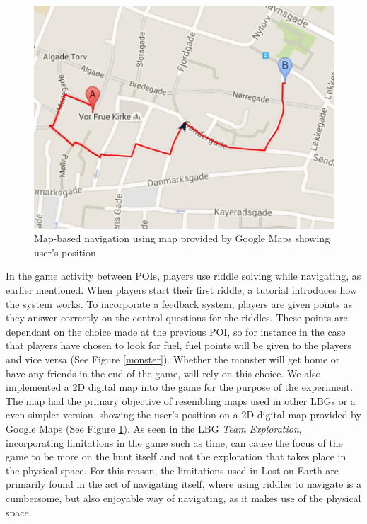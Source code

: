 \begin{figure}[hbtp]
\centering
\includegraphics[scale=0.24]{Pics/MapNav.png}
\caption{Map-based navigation using map provided by Google Maps showing user's position}
\label{map}
\end{figure}

In the game activity between POIs, players use riddle solving while navigating, as earlier mentioned. When players start their first riddle, a tutorial introduces how the system works. To incorporate a feedback system, players are given points as they answer correctly on the control questions for the riddles. These points are dependant on the choice made at the previous POI, so for instance in the case that players have chosen to look for fuel, fuel points will be given to the players and vice versa (See Figure \ref{monster}). Whether the monster will get home or have any friends in the end of the game, will rely on this choice. We also implemented a 2D digital map into the game for the purpose of the experiment. The map had the primary objective of resembling maps used in other LBGs or a even simpler version, showing the user's position on a 2D digital map provided by Google Maps (See Figure \ref{map}). As seen in the LBG \textit{Team Exploration}, incorporating limitations in the game such as time, can cause the focus of the game to be more on the hunt itself and not the exploration that takes place in the physical space. For this reason, the limitations used in Lost on Earth are primarily found in the act of navigating itself, where using riddles to navigate is a cumbersome, but also enjoyable way of navigating, as it makes use of the physical space. 
